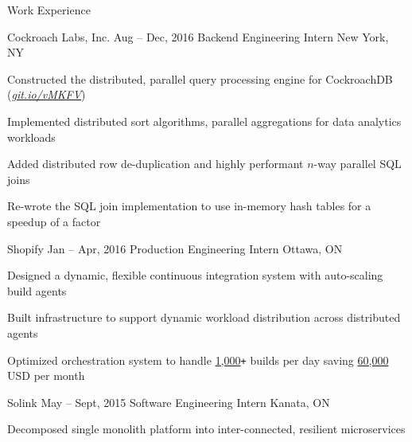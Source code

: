 \documentclass{resume} %
\begin{document}
\begin{rSection}{Work Experience}
  \begin{rSubsection}{Cockroach Labs, Inc.}
                     {Aug -- Dec, 2016}
                     {Backend Engineering Intern}
                     {New York, NY}

    \item Constructed the distributed, parallel query processing engine for
      CockroachDB ({\em \href{https://git.io/vMKFV}{git.io/vMKFV}})
    \item Implemented distributed sort algorithms, parallel aggregations for
      data analytics workloads
    \item Added distributed row de-duplication and highly performant $n$-way
      parallel SQL joins
    \item Re-wrote the SQL join implementation to use in-memory hash
      tables for a speedup of a factor
  \end{rSubsection}

  \begin{rSubsection}{Shopify}
                     {Jan -- Apr, 2016}
                     {Production Engineering Intern}
                     {Ottawa, ON}

  \item Designed a dynamic, flexible continuous integration system with
    auto-scaling build agents
  \item Built infrastructure to support dynamic workload distribution across
    distributed agents
  \item Optimized orchestration system to handle \underline{1,000}\texttt{+} builds per
    day saving \underline{60,000} USD per month
  \end{rSubsection}

  \begin{rSubsection}{Solink}
                     {May -- Sept, 2015}
                     {Software Engineering Intern}
                     {Kanata, ON}

    \item Decomposed single monolith platform into inter-connected, resilient
      microservices
  \end{rSubsection}
\end{rSection}

\end{document}
